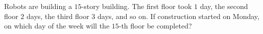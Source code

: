 Robots are building a $15$-story building. The first floor took $1$ day, the second floor $2$ days, the third floor $3$ days, and so on. If construction started on Monday, on which day of the week will the $15$-th floor be completed?
